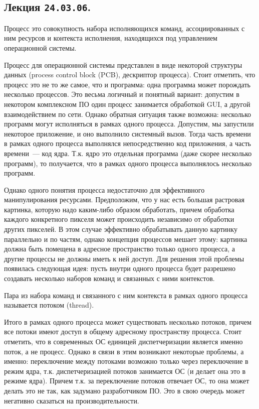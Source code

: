 \subsection{%
  Лекция \texttt{24.03.06}.%
}


\begin{definition}
  Процесс это совокупность набора исполняющихся команд, ассоциированных с ним
  ресурсов и контекста исполнения, находящихся под управлением операционной
  системы.
\end{definition}

Процесс для операционной системы представлен в виде некоторой структуры данных
(process control block (PCB), дескриптор процесса). Стоит отметить, что процесс
это не то же самое, что и программа: одна программа может порождать несколько
процессов. Это весьма логичный и понятный вариант: допустим в некотором
комплексном ПО один процесс занимается обработкой GUI, а другой взаимодействием
по сети. Однако обратная ситуация также возможна: несколько программ могут
исполняться в рамках одного процесса. Допустим, мы запустили некоторое
приложение, и оно выполнило системный вызов. Тогда часть времени в рамках одного
процесса выполнялся непосредственно код приложения, а часть времени~--- код
ядра. Т.к. ядро это отдельная программа (даже скорее несколько программ), то
получается, что в рамках одного процесса выполнялось несколько программ.

Однако одного понятия процесса недостаточно для эффективного манипулирования
ресурсами. Предположим, что у нас есть большая растровая картинка, которую надо
каким-либо образом обработать, причем обработка каждого конкретного пикселя
может происходить независимо от обработки других пикселей. В этом случае
эффективно обрабатывать данную картинку параллельно и по частям, однако
концепция процессов мешает этому: картинка должна быть помещена в адресное
пространство только одного процесса, а другие процессы не должны иметь к ней
доступ. Для решения этой проблемы появилась следующая идея: пусть внутри одного
процесса будет разрешено создавать несколько наборов команд и связанных с ними
контекстов.

\begin{definition}
  Пара из набора команд и связанного с ним контекста в рамках одного процесса
  называется потоком (thread).
\end{definition}

Итого в рамках одного процесса может существовать несколько потоков, причем все
потоки имеют доступ в общему адресному пространству процесса. Стоит отметить,
что в современных ОС единицей диспетчеризации является именно поток, а не
процесс. Однако в связи в этим возникают некоторые проблемы, а именно:
переключение между потоками возможно только через переключение в режим ядра,
т.к. диспетчеризацией потоков занимается ОС (и делает она это в режиме ядра).
Причем т.к. за переключение потоков отвечает ОС, то она может делать это не так,
как задумано разработчиком ПО. Это в свою очередь может негативно сказаться на
производительности.

